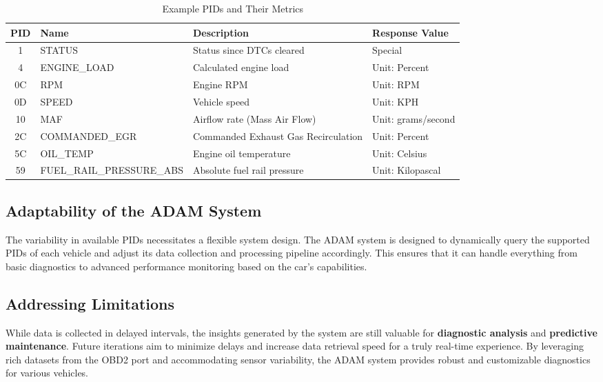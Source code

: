 \begin{table}[h!]
    \centering
    \caption{Example PIDs and Their Metrics}
    \label{tab:pids_metrics}
    \renewcommand{\arraystretch}{2.5} %
    \begin{tabular}{ | c | p{7cm} | p{5cm} | p{3cm} | }
        \hline
        \textbf{PID} & \textbf{Name} & \textbf{Description} & \textbf{Response Value} \\
        \hline
        1  & STATUS               & Status since DTCs cleared              & Special \\  \hline
        4  & ENGINE\_LOAD         & Calculated engine load                 & Unit: Percent \\  \hline
        0C & RPM                  & Engine RPM                             & Unit: RPM \\  \hline
        0D & SPEED                & Vehicle speed                          & Unit: KPH \\  \hline
        10 & MAF                  & Airflow rate (Mass Air Flow)           & Unit: grams/second \\  \hline
        2C & COMMANDED\_EGR       & Commanded Exhaust Gas Recirculation    & Unit: Percent \\  \hline
        5C & OIL\_TEMP            & Engine oil temperature                 & Unit: Celsius \\  \hline
        59 & FUEL\_RAIL\_PRESSURE\_ABS & Absolute fuel rail pressure      & Unit: Kilopascal \\  \hline
    \end{tabular}
\end{table}


\subsection{Adaptability of the ADAM System}
The variability in available PIDs necessitates a flexible system design. The ADAM system is designed to dynamically query the supported PIDs of each vehicle and adjust its data collection and processing pipeline accordingly. This ensures that it can handle everything from basic diagnostics to advanced performance monitoring based on the car's capabilities.

\subsection{Addressing Limitations}
While data is collected in delayed intervals, the insights generated by the system are still valuable for \textbf{diagnostic analysis} and \textbf{predictive maintenance}. Future iterations aim to minimize delays and increase data retrieval speed for a truly real-time experience. By leveraging rich datasets from the OBD2 port and accommodating sensor variability, the ADAM system provides robust and customizable diagnostics for various vehicles.

